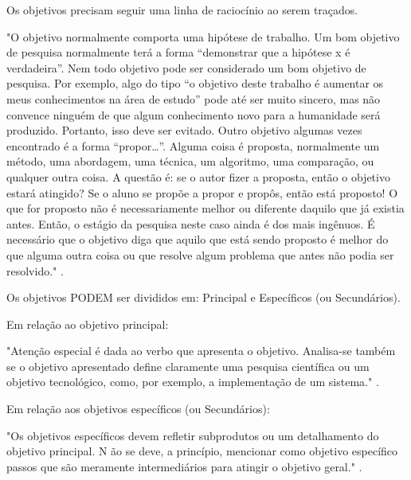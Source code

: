 \documentclass[
	article,			%
	12pt,				%
	oneside,			%
	a4paper,			%
    BIBLATEX,           %
	english,			%
	brazil,				%
	sumario=tradicional
	]{abntex2}
\begin{document}
Os objetivos precisam seguir uma linha de raciocínio ao serem traçados.
    \begin{citacao}
    "O objetivo normalmente comporta uma hipótese de trabalho. Um bom objetivo de pesquisa normalmente terá
    a forma “demonstrar que a hipótese x é verdadeira”.
    Nem todo objetivo pode ser considerado um bom objetivo de pesquisa. Por exemplo, algo do tipo “o objetivo
    deste trabalho é aumentar os meus conhecimentos na área de estudo” pode até ser muito sincero, mas não
    convence ninguém de que algum conhecimento novo para a humanidade será produzido. Portanto, isso deve ser evitado.
    Outro objetivo algumas vezes encontrado é a forma “propor…”. Alguma coisa é proposta, normalmente um
    método, uma abordagem, uma técnica, um algoritmo, uma comparação, ou qualquer outra coisa. A questão é:
    se o autor fizer a proposta, então o objetivo estará atingido? Se o aluno se propõe a propor e propôs, então está
    proposto! O que for proposto não é necessariamente melhor ou diferente daquilo que já existia antes. Então, o
    estágio da pesquisa neste caso ainda é dos mais ingênuos.
    É necessário que o objetivo diga que aquilo que está sendo proposto é melhor do que alguma outra coisa ou
    que resolve algum problema que antes não podia ser resolvido."  \cite{PESQUISA:RAUL}.
    \end{citacao}

Os objetivos PODEM ser divididos em: Principal e Específicos (ou Secundários).

Em relação ao objetivo principal:

    \begin{citacao}
    "Atenção especial é dada ao verbo que apresenta o objetivo.
    Analisa-se também se o objetivo apresentado define claramente uma pesquisa científica ou um objetivo
    tecnológico, como, por exemplo, a implementação de um sistema."
    \lipsum[5] \cite{PESQUISA:RAUL}.
    \end{citacao}

Em relação aos objetivos específicos (ou Secundários):

    \begin{citacao}
    "Os objetivos específicos devem refletir subprodutos ou um detalhamento do objetivo principal. N ão se deve, a
    princípio, mencionar como objetivo específico passos que são meramente intermediários para atingir o objetivo
    geral."
    \lipsum[5] \cite{PESQUISA:RAUL}.
    \end{citacao}
\end{document}
